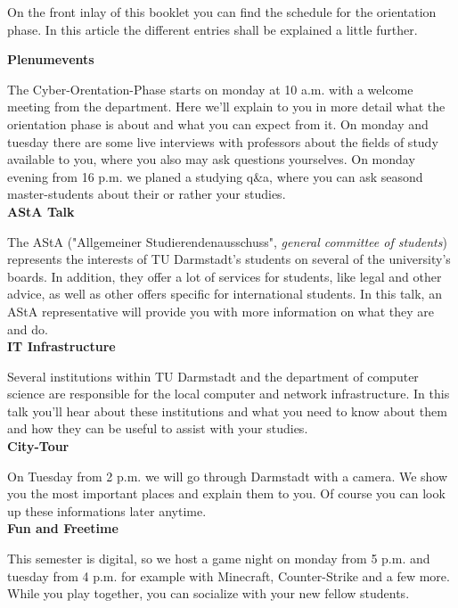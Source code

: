 {On the front inlay of this booklet you can find the schedule for the orientation phase. In this article the different entries shall be explained a little further.}
{\textbf{Plenumevents}

The Cyber-Orentation-Phase starts on monday at 10 a.m. with a welcome meeting from the department. Here we’ll explain to you in more detail what the orientation phase is about and what you can expect from it. On monday and tuesday there are some live interviews with professors about the fields of study available to you, where you also may ask questions yourselves. On monday evening from 16 p.m. we planed a studying q\&a, where you can ask seasond master-students about their or rather your studies.\\

\noindent\textbf{AStA Talk}

The AStA ("Allgemeiner Studierendenausschuss", \textit{general committee of students}) represents the interests of TU Darmstadt's students on several of the university's boards. In addition, they offer a lot of services for students, like legal and other advice, as well as other offers specific for international students. In this talk, an AStA representative will provide you with more information on what they are and do.\\

\noindent\textbf{IT Infrastructure}

Several institutions within TU Darmstadt and the department of computer science are responsible for the local computer and network infrastructure. In this talk you'll hear about these institutions and what you need to know about them and how they can be useful to assist with your studies.\\

\noindent\textbf{City-Tour}

On Tuesday from 2 p.m. we will go through Darmstadt with a camera. We show you the most important places and explain them to you. Of course you can look up these informations later anytime.\\

\noindent\textbf{Fun and Freetime}

This semester is digital, so we host a game night on monday from 5 p.m. and tuesday from 4 p.m. for example with Minecraft, Counter-Strike and a few more. While you play together, you can socialize with your new fellow students.
}{}
